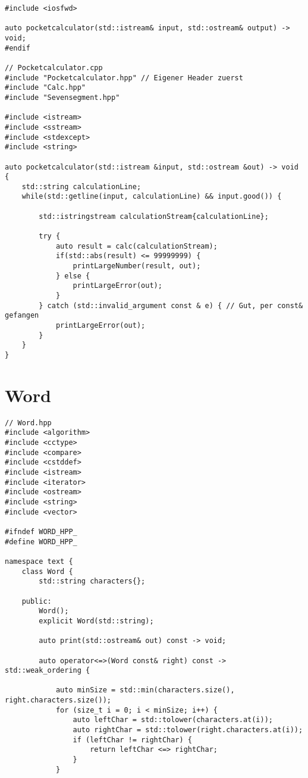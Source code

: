 \begin{multicols*}{3}
\begin{verbatim}
#include <iosfwd>

auto pocketcalculator(std::istream& input, std::ostream& output) -> void;
#endif

// Pocketcalculator.cpp
#include "Pocketcalculator.hpp" // Eigener Header zuerst
#include "Calc.hpp"
#include "Sevensegment.hpp"

#include <istream>
#include <sstream>
#include <stdexcept>
#include <string>

auto pocketcalculator(std::istream &input, std::ostream &out) -> void {
    std::string calculationLine;
    while(std::getline(input, calculationLine) && input.good()) {

        std::istringstream calculationStream{calculationLine};

        try {
            auto result = calc(calculationStream);
            if(std::abs(result) <= 99999999) {
                printLargeNumber(result, out);
            } else {
                printLargeError(out);
            }
        } catch (std::invalid_argument const & e) { // Gut, per const& gefangen
            printLargeError(out);
        }
    }
}
\end{verbatim}

\section{Word}
\begin{verbatim}
// Word.hpp
#include <algorithm>
#include <cctype>
#include <compare>
#include <cstddef>
#include <istream>
#include <iterator>
#include <ostream>
#include <string>
#include <vector>

#ifndef WORD_HPP_
#define WORD_HPP_

namespace text {
    class Word {
        std::string characters{};

    public:
        Word();
        explicit Word(std::string);

        auto print(std::ostream& out) const -> void;

        auto operator<=>(Word const& right) const -> std::weak_ordering {

            auto minSize = std::min(characters.size(), right.characters.size());
            for (size_t i = 0; i < minSize; i++) {
                auto leftChar = std::tolower(characters.at(i));
                auto rightChar = std::tolower(right.characters.at(i));
                if (leftChar != rightChar) {
                    return leftChar <=> rightChar;
                }
            }


\end{verbatim}
\end{multicols*}
